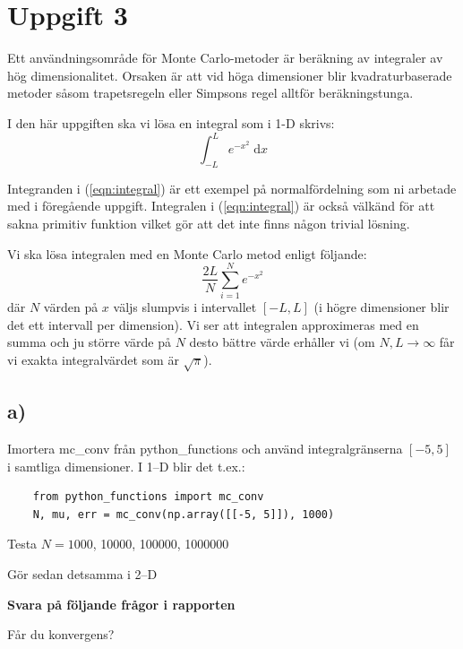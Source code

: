 \documentclass[a4paper]{article}
\begin{document}
\section{Uppgift 3}
Ett användningsområde för Monte Carlo-metoder är beräkning av integraler av hög dimensionalitet.
Orsaken är att vid höga dimensioner blir kvadraturbaserade metoder såsom trapetsregeln eller
Simpsons regel alltför beräkningstunga.

I den här uppgiften ska vi lösa en integral som i 1-D skrivs:
\begin{equation} \label{eqn:integral}
    \int_{-L}^{L}e^{-x^2}\; \mathrm{d}x
\end{equation}

Integranden i (\ref{eqn:integral}) är ett exempel på normalfördelning som ni arbetade med i föregående uppgift.
Integralen i (\ref{eqn:integral}) är också välkänd för att sakna primitiv funktion vilket gör att det inte
finns någon trivial lösning.

Vi ska lösa integralen med en Monte Carlo metod enligt följande:
\begin{equation} \label{eqn:integral_mc}
    \frac{2L}{N}\displaystyle\sum_{i=1}^{N}e^{-x^2}
\end{equation}
där \(N\) värden på \(x\) väljs slumpvis i intervallet \([-L,L]\)
(i högre dimensioner blir det ett intervall per dimension).
Vi ser att integralen approximeras med en summa och ju större värde på
\(N\) desto bättre värde erhåller vi (om \(N,L \rightarrow \infty\) får vi exakta integralvärdet som är \( \sqrt{\pi} \)).


\subsection{a)}
Imortera mc\_conv från python\_functions och använd integralgränserna \( [-5, 5] \) i samtliga dimensioner.
I 1--D blir det t.ex.:
\begin{lstlisting}
    from python_functions import mc_conv
    N, mu, err = mc_conv(np.array([[-5, 5]]), 1000)
\end{lstlisting}
Testa \( N=1000 \), 10000, 100000, 1000000

Gör sedan detsamma i 2--D


\textbf{Svara på följande frågor i rapporten}

Får du konvergens?
\end{document}
